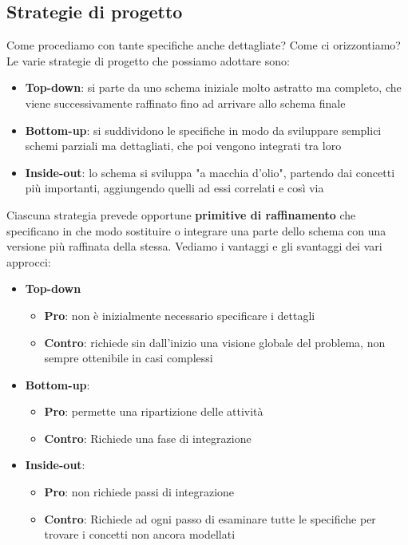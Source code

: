 \documentclass[12pt]{article}
\begin{document}
\subsection{Strategie di progetto}
Come procediamo con tante specifiche anche dettagliate? Come ci orizzontiamo?
Le varie strategie di progetto che possiamo adottare sono:
\begin{itemize}
    \item \textbf{Top-down}: si parte da uno schema iniziale molto astratto ma completo, che viene successivamente raffinato fino ad arrivare allo schema finale
    \item \textbf{Bottom-up}: si suddividono le specifiche in modo da sviluppare semplici schemi parziali ma dettagliati, che poi vengono integrati tra loro
    \item \textbf{Inside-out}: lo schema si sviluppa "a macchia d'olio", partendo dai concetti più importanti, aggiungendo quelli ad essi correlati e così via
\end{itemize}
Ciascuna strategia prevede opportune \textbf{primitive di raffinamento} che specificano in che modo sostituire o integrare una parte dello schema con una versione più raffinata della stessa.
Vediamo i vantaggi e gli svantaggi dei vari approcci:
\begin{itemize}
    \item \textbf{Top-down}
    \begin{itemize}
        \item \textbf{Pro}: non è inizialmente necessario specificare i dettagli
        \item \textbf{Contro}: richiede sin dall'inizio una visione globale del problema, non sempre ottenibile in casi complessi
    \end{itemize}
    \item \textbf{Bottom-up}:
    \begin{itemize}
        \item \textbf{Pro}: permette una ripartizione delle attività 
        \item \textbf{Contro}: Richiede una fase di integrazione
    \end{itemize}
    \item \textbf{Inside-out}:
    \begin{itemize}
        \item \textbf{Pro}: non richiede passi di integrazione
        \item \textbf{Contro}: Richiede ad ogni passo di esaminare tutte le specifiche per trovare i concetti non ancora modellati
    \end{itemize}
\end{itemize}
\end{document}
